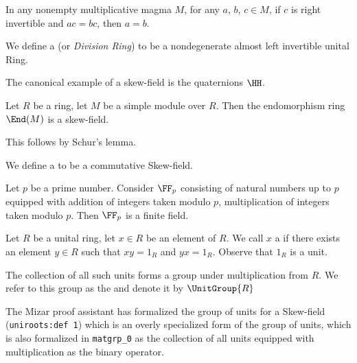 \begin{proposition}
In any nonempty multiplicative magma $M$,
for any $a$, $b$, $c\in M$, if $c$ is right invertible and $ac=bc$,
then $a=b$.
\end{proposition}

\begin{definition}
We define a  (or \emph{Division Ring}) to be a
nondegenerate almost left invertible unital Ring.
\end{definition}

\begin{example}
The canonical example of a skew-field is the quaternions $\HH$.
\end{example}

\begin{theorem}
Let $R$ be a ring, let $M$ be a simple module over $R$. Then the endomorphism ring $\End(M)$ is a
skew-field.
\end{theorem}

This follows by Schur's lemma.

\begin{definition}[Field]
We define a  to be a commutative Skew-field.
\end{definition}

\begin{example}
Let $p$ be a prime number. Consider $\FF_{p}$ consisting of natural
numbers up to $p$ equipped with addition of integers taken modulo $p$,
multiplication of integers taken modulo $p$. Then $\FF_{p}$ is a
finite field.
\end{example}

\begin{definition}
Let $R$ be a unital ring, let $x\in R$ be an element of $R$.
We call $x$ a  if there exists an element $y\in R$
such that $xy=1_{R}$ and $yx=1_{R}$. Observe that $1_{R}$ is a unit.

The collection of all such units forms a group under multiplication
from $R$. We refer to this group as the  and
denote it by $\UnitGroup{R}$
\end{definition}

\begin{remark}
The Mizar proof assistant has formalized the group of units for a
Skew-field (\texttt{uniroots:def~1}) which is an overly specialized
form of the group of units, which is also formalized in \texttt{matgrp\_0}
as the collection of all units equipped with multiplication as the
binary operator.
\end{remark}

